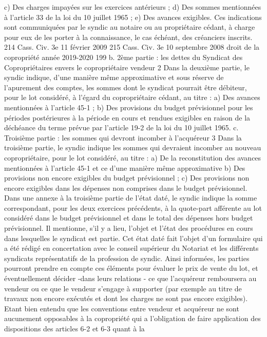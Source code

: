 	c) Des charges impayées sur les exercices antérieurs ;
	d) Des sommes mentionnées à l'article 33 de la loi du 10 juillet 1965 ;
	e) Des avances exigibles.
	Ces indications sont communiquées par le syndic au notaire ou au propriétaire cédant, à charge pour eux
	de les porter à la connaissance, le cas échéant, des créanciers inscrits.
	214 Cass. Civ. 3e 11 février 2009
	215 Cass. Civ. 3e 10 septembre 2008
	droit de la copropriété année 2019-2020
	199
	b. 2ème partie : les dettes du Syndicat des Copropriétaires envers le
	copropriétaire vendeur
	2\degre{} Dans la deuxième partie, le syndic indique, d'une manière même approximative et sous réserve de
	l'apurement des comptes, les sommes dont le syndicat pourrait être débiteur, pour le lot considéré, à
	l'égard du copropriétaire cédant, au titre :
	a) Des avances mentionnées à l'article 45-1 ;
	b) Des provisions du budget prévisionnel pour les périodes postérieures à la période en cours et rendues
	exigibles en raison de la déchéance du terme prévue par l'article 19-2 de la loi du 10 juillet 1965.
	c. Troisième partie : les sommes qui devront incomber à l’acquéreur
	3\degre{} Dans la troisième partie, le syndic indique les sommes qui devraient incomber au nouveau copropriétaire,
	pour le lot considéré, au titre :
	a) De la reconstitution des avances mentionnées à l'article 45-1 et ce d'une manière même approximative
	b) Des provisions non encore exigibles du budget prévisionnel ;
	c) Des provisions non encore exigibles dans les dépenses non comprises dans le budget prévisionnel.
	Dans une annexe à la troisième partie de l'état daté, le syndic indique la somme correspondant, pour les
	deux exercices précédents, à la quote-part afférente au lot considéré dans le budget prévisionnel et dans
	le total des dépenses hors budget prévisionnel. Il mentionne, s'il y a lieu, l'objet et l'état des procédures en
	cours dans lesquelles le syndicat est partie.
	Cet état daté fait l’objet d’un formulaire qui a été rédigé en concertation avec le conseil supérieur du
	Notariat et les différents syndicats représentatifs de la profession de syndic.
	Ainsi informées, les parties pourront prendre en compte ces éléments pour évaluer le prix de vente du lot,
	et éventuellement décider -dans leurs relations - ce que l'acquéreur remboursera au vendeur ou ce que le
	vendeur s'engage à supporter (par exemple au titre de travaux non encore exécutés et dont les charges
	ne sont pas encore exigibles).
	Etant bien entendu que les conventions entre vendeur et acquéreur ne sont aucunement opposables à la
	copropriété qui a l’obligation de faire application des dispositions des articles 6-2 et 6-3 quant à la
